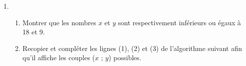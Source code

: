 \documentclass[10pt]{article}
\begin{document}
\begin{enumerate}
\item 
	\begin{enumerate}
		\item Montrer que les nombres $x$ et $y$ sont respectivement inférieurs ou égaux à 18 et 9.		
		\item Recopier et compléter les lignes (1), (2) et (3) de l'algorithme suivant afin qu'il affiche les couples ($x$ ; $y$) possibles.

\begin{center}
\end{center}
%
		

\end{enumerate}
\end{enumerate}
\end{document}
